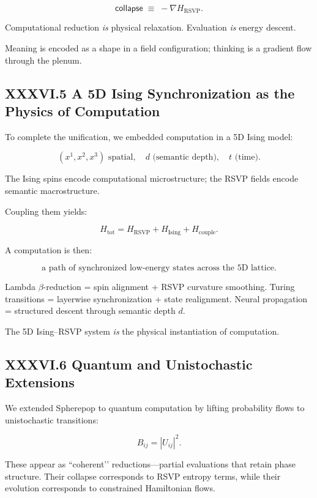 \documentclass[11pt,letterpaper]{article}
\begin{document}
\[
\mathsf{collapse}
\;\equiv\;
-\nabla H_{\text{RSVP}}.
\]

Computational reduction \emph{is} physical relaxation.  
Evaluation \emph{is} energy descent.

Meaning is encoded as a shape in a field configuration;
thinking is a gradient flow through the plenum.

\subsection{XXXVI.5 A 5D Ising Synchronization as the Physics of Computation}

To complete the unification, we embedded computation in a 5D Ising model:

\[
(x^1, x^2, x^3) \text{ spatial},\quad 
d \text{ (semantic depth)},\quad
t \text{ (time)}.
\]

The Ising spins encode computational microstructure;
the RSVP fields encode semantic macrostructure.

Coupling them yields:

\[
H_{\text{tot}} = 
H_{\text{RSVP}}
+ H_{\text{Ising}}
+ H_{\text{couple}}.
\]

A computation is then:

\[
\boxed{
\text{a path of synchronized low-energy states across the 5D lattice}.
}
\]

Lambda $\beta$-reduction  
= spin alignment + RSVP curvature smoothing.  
Turing transitions  
= layerwise synchronization + state realignment.  
Neural propagation  
= structured descent through semantic depth $d$.

The 5D Ising–RSVP system \emph{is} the physical instantiation of computation.

\subsection{XXXVI.6 Quantum and Unistochastic Extensions}

We extended Spherepop to quantum computation by lifting probability flows 
to unistochastic transitions:

\[
B_{ij} = |U_{ij}|^2.
\]

These appear as ``coherent’’ reductions—partial evaluations that retain phase structure.
Their collapse corresponds to RSVP entropy terms, 
while their evolution corresponds to constrained Hamiltonian flows.
\end{document}
